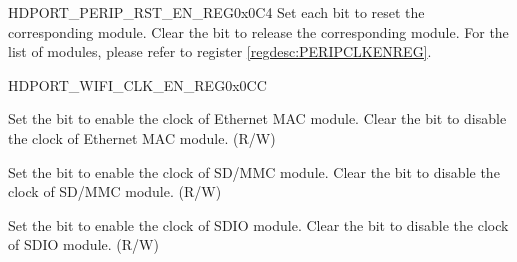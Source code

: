 \begin{register}{H}{DPORT\_PERIP\_RST\_EN\_REG}{0x0C4}\label{regdesc:PERIPRSTENREG}
%
%
%
%
%
%
%
%
%
%
%
%
%
%
%
%
%
%
%
%
%
%
%
%
%
%
%
%
\regnewline%
\vspace{1.5em}
Set each bit to reset the corresponding module. Clear the bit to release the corresponding module. For the list of modules, please refer to register \ref{regdesc:PERIPCLKENREG}.
\end{register}



\begin{register}{H}{DPORT\_WIFI\_CLK\_EN\_REG}{0x0CC}\label{regdesc:WIFICLKENREG}
%
%
%
%
%
%
\regnewline%
\begin{regdesc}\begin{reglist}
\item [DPORT\_WIFI\_CLK\_EMAC\_EN] Set the bit to enable the clock of Ethernet MAC module. Clear the bit to disable the clock of Ethernet MAC module. (R/W)
\item [DPORT\_WIFI\_CLK\_SDIO\_HOST\_EN] Set the bit to enable the clock of SD/MMC module. Clear the bit to disable the clock of SD/MMC module. (R/W)
\item [DPORT\_WIFI\_CLK\_SDIOSLAVE\_EN] Set the bit to enable the clock of SDIO module. Clear the bit to disable the clock of SDIO module. (R/W)
\end{reglist}\end{regdesc}
\end{register}


